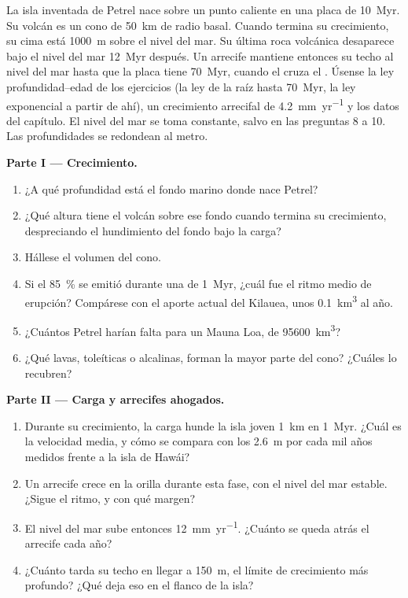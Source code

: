 \begin{problem}\label{pb:b2:oceanic-islands:1}
La isla inventada de Petrel nace sobre un punto caliente en una placa de \qty{10}{Myr}. Su volcán es
un cono de \qty{50}{km} de radio basal. Cuando termina su crecimiento, su cima está \qty{1000}{m} sobre el
nivel del mar. Su última roca volcánica desaparece bajo el nivel del mar \qty{12}{Myr} después. Un arrecife
mantiene entonces su techo al nivel del mar hasta que la placa tiene \qty{70}{Myr}, cuando el  cruza el
. Úsense la ley profundidad--edad de los ejercicios (la ley de la raíz hasta \qty{70}{Myr}, la
ley exponencial a partir de ahí), un crecimiento arrecifal de \qty{4.2}{mm.yr^{-1}} y los datos del capítulo.
El nivel del mar se toma constante, salvo en las preguntas 8 a 10. Las profundidades se redondean al metro.

\noindent\textbf{Parte I --- Crecimiento.}
\begin{enumerate}
  \item ¿A qué profundidad está el fondo marino donde nace Petrel?
  \item ¿Qué altura tiene el volcán sobre ese fondo cuando termina su crecimiento, despreciando el
        hundimiento del fondo bajo la carga?
  \item Hállese el volumen del cono.
  \item Si el \qty{85}{\percent} se emitió durante una  de \qty{1}{Myr}, ¿cuál fue el
        ritmo medio de erupción? Compárese con el aporte actual del Kilauea, unos
        \qty{0.1}{km^3} al año.
  \item ¿Cuántos Petrel harían falta para un Mauna Loa, de \qty{95600}{km^3}?
  \item ¿Qué lavas, toleíticas o alcalinas, forman la mayor parte del cono? ¿Cuáles lo recubren?
\end{enumerate}

\noindent\textbf{Parte II --- Carga y arrecifes ahogados.}
\begin{enumerate}[resume]
  \item Durante su crecimiento, la carga hunde la isla joven \qty{1}{km} en \qty{1}{Myr}. ¿Cuál es
        la velocidad media, y cómo se compara con los \qty{2.6}{m} por cada mil años medidos
        frente a la isla de Hawái?
  \item Un arrecife crece en la orilla durante esta fase, con el nivel del mar estable. ¿Sigue el ritmo, y
        con qué margen?
  \item El nivel del mar sube entonces \qty{12}{mm.yr^{-1}}. ¿Cuánto se queda atrás el arrecife cada
        año?
  \item ¿Cuánto tarda su techo en llegar a \qty{150}{m}, el límite de crecimiento más profundo? ¿Qué
        deja eso en el flanco de la isla?
\end{enumerate}


\end{problem}
